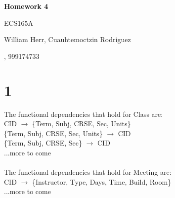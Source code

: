 \documentclass[fleqn]{article}
\begin{document}
{\raggedleft \LARGE \textbf{Homework 4}\par}
{\raggedleft ECS165A\par}
{\raggedleft William Herr, Cuauhtemoctzin Rodriguez\par}
{, 999174733\par}



\section*{1}
	


    The functional dependencies that hold for Class are: \\
    CID $\to$ \{Term, Subj, CRSE, Sec, Units\} \\
    \{Term, Subj, CRSE, Sec, Units\} $\to$ CID  \\
    \{Term, Subj, CRSE, Sec\} $\to$ CID  \\
    ...more to come \\
    \\
    The functional dependencies that hold for Meeting are: \\
	CID $\to$ \{Instructor, Type, Days, Time, Build, Room\} \\
    ...more to come \\    
    
\end{document}
